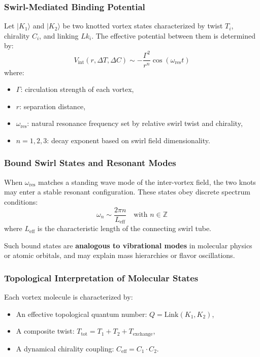 \subsubsection*{Swirl-Mediated Binding Potential}

Let $|K_1\rangle$ and $|K_2\rangle$ be two knotted vortex states characterized by twist $T_i$, chirality $C_i$, and linking $Lk_i$. The effective potential between them is determined by:
\begin{equation}
V_{\text{int}}(r, \Delta T, \Delta C) \sim -\frac{\Gamma^2}{r^n} \cos(\omega_{\text{res}} t)
\end{equation}
where:
\begin{itemize}
    \item $\Gamma$: circulation strength of each vortex,
    \item $r$: separation distance,
    \item $\omega_{\text{res}}$: natural resonance frequency set by relative swirl twist and chirality,
    \item $n = 1, 2, 3$: decay exponent based on swirl field dimensionality.
\end{itemize}

\subsubsection*{Bound Swirl States and Resonant Modes}

When $\omega_{\text{res}}$ matches a standing wave mode of the inter-vortex field, the two knots may enter a stable resonant configuration. These states obey discrete spectrum conditions:
\[
\omega_n \sim \frac{2\pi n}{L_{\text{eff}}}
\quad \text{with } n \in \mathbb{Z}
\]
where $L_{\text{eff}}$ is the characteristic length of the connecting swirl tube.

Such bound states are \textbf{analogous to vibrational modes} in molecular physics or atomic orbitals, and may explain mass hierarchies or flavor oscillations.

\subsubsection*{Topological Interpretation of Molecular States}

Each vortex molecule is characterized by:
\begin{itemize}
    \item An effective topological quantum number: $Q = \text{Link}(K_1, K_2)$,
    \item A composite twist: $T_{\text{tot}} = T_1 + T_2 + T_{\text{exchange}}$,
    \item A dynamical chirality coupling: $C_{\text{eff}} = C_1 \cdot C_2$.
\end{itemize}

